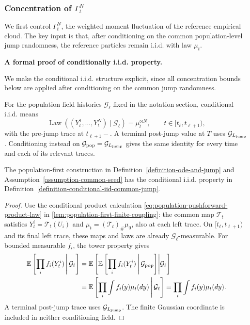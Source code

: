 \subsubsection{Concentration of $\Gamma_t^N$}
\label{subsubsec:general-argument-bound-gamma}

We first control \(\Gamma_t^N\), the weighted moment fluctuation of the
reference empirical cloud.  The key input is that, after conditioning on the
common population-level jump randomness, the reference particles remain i.i.d.
with law \(\mu_t\).

\noindent
\textbf{A formal proof of conditionally i.i.d. property.}

We make the conditional i.i.d. structure explicit, since all concentration
bounds below are applied after conditioning on the common jump randomness.

\begin{definition}
\label{definition-conditional-iid-common-jump}
For the population field histories $\mathcal G_\ell$ fixed in the notation
section, conditional i.i.d. means
\[
\operatorname{Law}((Y_t^1,\ldots,Y_t^N)\mid\mathcal G_\ell)
=\mu_t^{\otimes N},\qquad t\in[t_\ell,t_{\ell+1}),
\]
with the pre-jump trace at $t_{\ell+1}-$. A terminal post-jump value at $T$
uses $\mathcal G_{L_{\mathrm{jump}}}$. Conditioning instead on
$\mathcal G_{\rm pop}=\mathcal G_{L_{\mathrm{jump}}}$ gives the same identity for every
time and each of its relevant traces.
\end{definition}
\begin{lemma}
\label{lemma-gp-jump-implies-conditional-iid}
The population-first construction in Definition~\ref{definition-ode-and-jump}
and Assumption~\ref{assumption-common-seed} has the conditional i.i.d.
property in Definition~\ref{definition-conditional-iid-common-jump}.
\end{lemma}
\begin{proof}
Use the conditional product calculation
\eqref{eq:population-pushforward-product-law} in
\cref{lem:population-first-finite-coupling}: the common map
$\mathcal T_t$ satisfies $Y_t^i=\mathcal T_t(U_i)$ and
$\mu_t=(\mathcal T_t)_\#\mu_0$, also at each left trace.
On $[t_\ell,t_{\ell+1})$ and its final left trace, these maps and laws
are already $\mathcal G_\ell$-measurable. For bounded measurable $f_i$,
the tower property gives
\[
\begin{aligned}
 \mathbb E\left[\prod_i f_i(Y_t^i)\,\middle|\,\mathcal G_\ell\right]
 &=\mathbb E\left[\mathbb E\left[\prod_i f_i(Y_t^i)
       \,\middle|\,\mathcal G_{\rm pop}\right]\middle|\mathcal G_\ell\right]\\
 &=\mathbb E\left[\prod_i\int f_i(y)\mu_t(dy)
       \,\middle|\,\mathcal G_\ell\right]
 =\prod_i\int f_i(y)\mu_t(dy).
\end{aligned}
\]
A terminal post-jump trace uses $\mathcal G_{L_{\mathrm{jump}}}$.
The finite Gaussian coordinate is included in neither conditioning field.
\end{proof}
